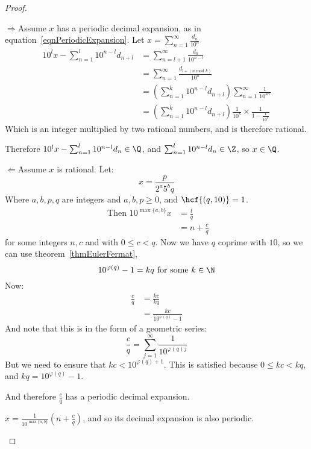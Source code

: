 \documentclass[../Main.tex]{subfiles}
\begin{document}
\begin{proof}
    \begin{proofdirection}{$\Rightarrow$}{Assume $x$ has a periodic decimal expansion, as in equation~\ref{eqnPeriodicExpansion}.}
        Let $x = \sum_{n=1}^{\infty} \frac{d_n}{10^n}$
        \begin{align*}
            10^l x - \sum_{n=1}^{l} 10^{n-l} d_{n+l} &= \sum_{n=l+1}^{\infty}\frac{d_n}{10^{n-l}} \\
            &= \sum_{n=1}^{\infty} \frac{d_{l + (n \text{ mod } k)}}{10^n} \\
            &= \left(\sum_{n=1}^{k}10^{n-l} d_{n+l}\right) \sum_{n=1}^{\infty} \frac{1}{10^{kn}} \\
            &= \left(\sum_{n=1}^{k}10^{n-l} d_{n+l}\right) \frac{1}{10^k} \times \frac{1}{1-\frac{1}{10^k}}
        \end{align*}
        Which is an integer multiplied by two rational numbers, and is therefore rational.\par
        Therefore $10^l x - \sum_{n=1}^{l} 10^{n-l} d_n \in \Q$, and $\sum_{n=1}^{l} 10^{n-l} d_n \in \Z$, so $x \in \Q$.
    \end{proofdirection}
    \begin{proofdirection}{$\Leftarrow$}{Assume $x$ is rational.}
        Let:
        \begin{equation*}
            x = \frac{p}{2^a 5^b q}
        \end{equation*}
        Where $a, b, p, q$ are integers and $a, b, p \geq 0$, and $\hcf{(q, 10)} = 1$.
        \begin{align*}
            \text{ Then } 10^{\max{\{a, b\}}} x &= \frac{t}{q} \\
            &= n + \frac{c}{q}
        \end{align*}
        for some integers $n, c$ and with $0 \leq c < q$. Now we have $q$ coprime with $10$, so we can use theorem~\ref{thmEulerFermat},
        \begin{equation*}
            10^{\varphi(q)} - 1 = kq \text{ for some } k \in \N
        \end{equation*}
        Now:
        \begin{align*}
            \frac{c}{q} &= \frac{kc}{kq} \\
            &= \frac{kc}{10^{\varphi(q)} - 1}
        \end{align*}
        And note that this is in the form of a geometric series:
        \begin{equation*}
            \frac{c}{q} = \sum_{j=1}^{\infty} \frac{1}{10^{\varphi(q) j}}
        \end{equation*}
        But we need to ensure that $kc < 10^{\varphi(q) + 1}$. This is satisfied because $0 \leq kc < kq$, and $kq = 10^{\varphi(q)} - 1$.\par
        And therefore $\frac{c}{q}$ has a periodic decimal expansion.\par
        $x = \frac{1}{10^{\max{\{a, b\}}}} \left(n + \frac{c}{q}\right)$, and so its decimal expansion is also periodic.
    \end{proofdirection}
\end{proof}
\end{document}

